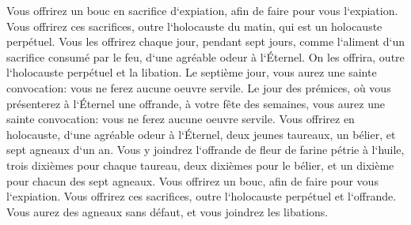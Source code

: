\verse Vous offrirez un bouc en sacrifice d`expiation, afin de faire pour vous l`expiation. 
\verse Vous offrirez ces sacrifices, outre l`holocauste du matin, qui est un holocauste perpétuel. 
\verse Vous les offrirez chaque jour, pendant sept jours, comme l`aliment d`un sacrifice consumé par le feu, d`une agréable odeur à l`Éternel. On les offrira, outre l`holocauste perpétuel et la libation. 
\verse Le septième jour, vous aurez une sainte convocation: vous ne ferez aucune oeuvre servile. 
\verse Le jour des prémices, où vous présenterez à l`Éternel une offrande, à votre fête des semaines, vous aurez une sainte convocation: vous ne ferez aucune oeuvre servile. 
\verse Vous offrirez en holocauste, d`une agréable odeur à l`Éternel, deux jeunes taureaux, un bélier, et sept agneaux d`un an. 
\verse Vous y joindrez l`offrande de fleur de farine pétrie à l`huile, trois dixièmes pour chaque taureau, deux dixièmes pour le bélier, 
\verse et un dixième pour chacun des sept agneaux. 
\verse Vous offrirez un bouc, afin de faire pour vous l`expiation. 
\verse Vous offrirez ces sacrifices, outre l`holocauste perpétuel et l`offrande. Vous aurez des agneaux sans défaut, et vous joindrez les libations. 

\chapter{}

